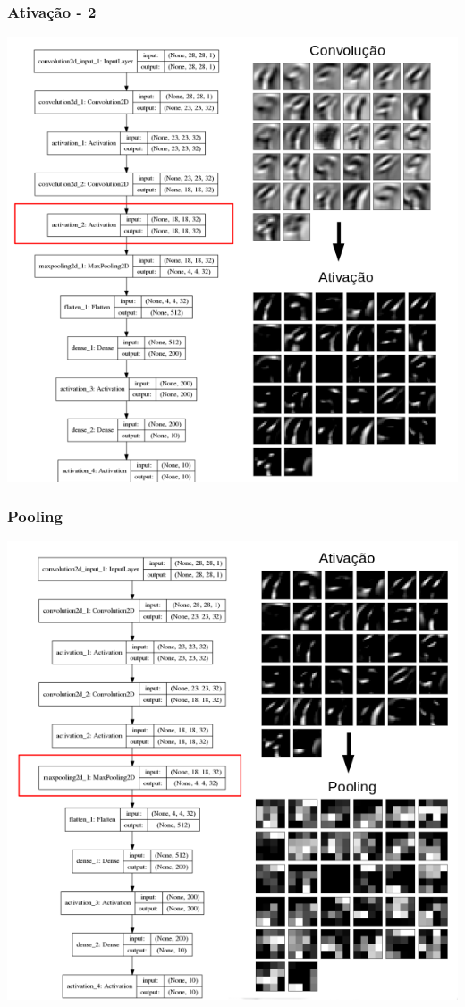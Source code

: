 \documentclass[tikz,10pt]{beamer}
\begin{document}
\begin{frame}
	\frametitle{Ativação - 2}
	\centering
	\includegraphics[height=.8\paperheight]{images/fabio/ativ_2}
\end{frame}

\begin{frame}
	\frametitle{Pooling}
	\centering
	\includegraphics[height=.8\paperheight]{images/fabio/pooling_1}
\end{frame}
\end{document}
